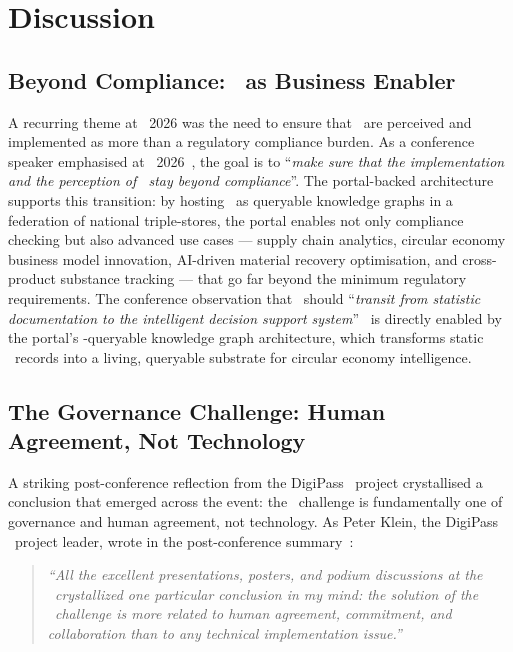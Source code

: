\section{Discussion}

\subsection{Beyond Compliance: \DPP\ as Business Enabler}

A recurring theme at \DPPforEU~2026 was the need to ensure that \DPPs\ are
perceived and implemented as more than a regulatory compliance burden. As a
conference speaker emphasised at \DPPforEU~2026~\cite{dpp4eu2026_day3}, the goal
is to ``\textit{make sure that the implementation and the perception of \DPPs\
stay beyond compliance}''. The portal-backed architecture supports this
transition: by hosting \DPPs\ as queryable knowledge graphs in a federation of
national triple-stores, the portal enables not only compliance checking but also
advanced use cases --- supply chain analytics, circular economy business model
innovation, AI-driven material recovery optimisation, and cross-product
substance tracking --- that go far beyond the minimum regulatory requirements.
The conference observation that \DPPs\ should ``\textit{transit from statistic
documentation to the intelligent decision support
system}''~\cite{dpp4eu2026_day3} is directly enabled by the portal's
\SPARQL-queryable knowledge graph architecture, which transforms static \DPP\
records into a living, queryable substrate for circular economy intelligence.

\subsection{The Governance Challenge: Human Agreement, Not Technology}

A striking post-conference reflection from the DigiPass \CSA\ project
crystallised a conclusion that emerged across the event: the \DPP\ challenge is
fundamentally one of governance and human agreement, not technology. As Peter
Klein, the DigiPass \CSA\ project leader, wrote in the post-conference
summary~\cite{dpp4eu2026_postconf}:

\begin{quote}\emph{
``All the excellent presentations, posters, and podium discussions at the
\DPPforEU\ crystallized one particular conclusion in my mind: the solution of
the \DPP\ challenge is more related to human agreement, commitment, and
collaboration than to any technical implementation issue.''
}
\end{quote}


